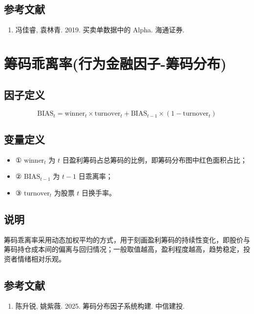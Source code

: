 \documentclass{article}
\begin{document}
\subsection{参考文献}
\begin{enumerate}
    \item 冯佳睿, 袁林青. 2019. 买卖单数据中的 Alpha. 海通证券.
\end{enumerate}

\section{筹码乖离率(行为金融因子-筹码分布)}

\subsection{因子定义}
\begin{equation}
    \mathrm{BIAS}_t = \mathrm{winner}_t \times \mathrm{turnover}_t + \mathrm{BIAS}_{t-1} \times (1 - \mathrm{turnover}_t)
\end{equation}

\subsection{变量定义}
\begin{itemize}
    \item ① \( \mathrm{winner}_t \) 为 \( t \) 日盈利筹码占总筹码的比例，即筹码分布图中红色面积占比；
    \item ② \( \mathrm{BIAS}_{t-1} \) 为 \( t-1 \) 日乖离率；
    \item ③ \( \mathrm{turnover}_t \) 为股票 \( t \) 日换手率。
\end{itemize}

\subsection{说明}
筹码乖离率采用动态加权平均的方式，用于刻画盈利筹码的持续性变化，即股价与筹码持仓成本间的偏离与回归情况；一般取值越高，盈利程度越高，趋势稳定，投资者情绪相对乐观。

\subsection{参考文献}
\begin{enumerate}
    \item 陈升锐, 姚紫薇. 2025. 筹码分布因子系统构建. 中信建投.
\end{enumerate}
\end{document}
